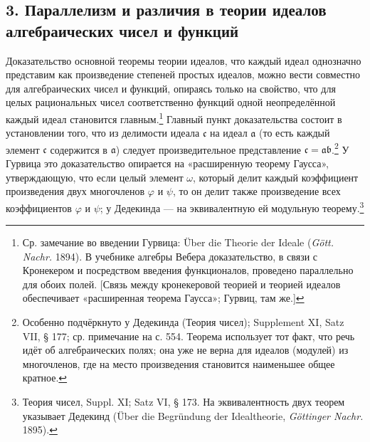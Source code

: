 \documentclass[11pt]{article}
\providecommand{\frc}{\mathfrak c}
\providecommand{\fra}{\mathfrak a}
\providecommand{\frb}{\mathfrak b}
\begin{document}
\subsection*{3. Параллелизм и различия в теории идеалов алгебраических чисел и функций}
Доказательство основной теоремы теории идеалов, что каждый идеал однозначно представим как произведение степеней простых идеалов, можно вести совместно для алгебраических чисел и функций, опираясь только на свойство, что для целых рациональных чисел соответственно функций одной неопределённой каждый идеал становится главным.\footnote{Ср. замечание во введении Гурвица: Über die Theorie der Ideale (\emph{Gött. Nachr.} 1894). В учебнике алгебры Вебера доказательство, в связи с Кронекером и посредством введения функционалов, проведено параллельно для обоих полей. [Связь между кронекеровой теорией и теорией идеалов обеспечивает «расширенная теорема Гаусса»; Гурвиц, там же.]} Главный пункт доказательства состоит в установлении того, что из делимости идеала \(\frc\) на идеал \(\fra\) (то есть каждый элемент \(\frc\) содержится в \(\fra\)) следует произведительное представление \(\frc=\fra\frb\).\footnote{Особенно подчёркнуто у Дедекинда (Теория чисел); Supplement XI, Satz VII, § 177; ср. примечание на с. 554. Теорема использует тот факт, что речь идёт об алгебраических полях; она уже не верна для идеалов (модулей) из многочленов, где на место произведения становится наименьшее общее кратное.} У Гурвица это доказательство опирается на «расширенную теорему Гаусса», утверждающую, что если целый элемент \(\omega\), который делит каждый коэффициент произведения двух многочленов \(\varphi\) и \(\psi\), то он делит также произведение всех коэффициентов \(\varphi\) и \(\psi\); у Дедекинда --- на эквивалентную ей модульную теорему.\footnote{Теория чисел, Suppl. XI; Satz VI, § 173. На эквивалентность двух теорем указывает Дедекинд (Über die Begründung der Idealtheorie, \emph{Göttinger Nachr.} 1895).}
\end{document}
